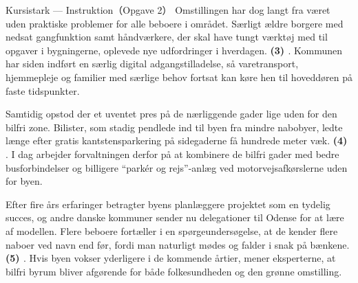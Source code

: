 \begin{emailbox}{Kursistark --- Instruktion（Opgave 2）}
\vspace{0.25em}
Omstillingen har dog langt fra været uden praktiske problemer for alle beboere i området. Særligt ældre borgere med nedsat gangfunktion samt håndværkere, der skal have tungt værktøj med til opgaver i bygningerne, oplevede nye udfordringer i hverdagen. \textbf{(3) \underline{\hspace{2.1cm}}}. Kommunen har siden indført en særlig digital adgangstilladelse, så varetransport, hjemmepleje og familier med særlige behov fortsat kan køre hen til hoveddøren på faste tidspunkter.

\vspace{0.25em}
Samtidig opstod der et uventet pres på de nærliggende gader lige uden for den bilfri zone. Bilister, som stadig pendlede ind til byen fra mindre nabobyer, ledte længe efter gratis kantstensparkering på sidegaderne få hundrede meter væk. \textbf{(4) \underline{\hspace{2.1cm}}}. I dag arbejder forvaltningen derfor på at kombinere de bilfri gader med bedre busforbindelser og billigere “parkér og rejs”-anlæg ved motorvejsafkørslerne uden for byen.

\vspace{0.25em}
Efter fire års erfaringer betragter byens planlæggere projektet som en tydelig succes, og andre danske kommuner sender nu delegationer til Odense for at lære af modellen. Flere beboere fortæller i en spørgeundersøgelse, at de kender flere naboer ved navn end før, fordi man naturligt mødes og falder i snak på bænkene. \textbf{(5) \underline{\hspace{2.1cm}}}. Hvis byen vokser yderligere i de kommende årtier, mener eksperterne, at bilfri byrum bliver afgørende for både folkesundheden og den grønne omstilling.
\end{emailbox}

